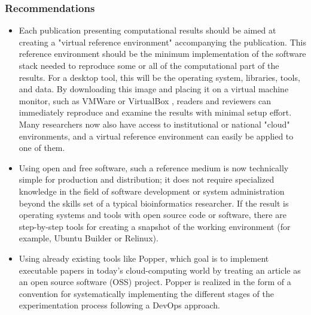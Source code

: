 \documentclass{vldb}
\begin{document}
\subsubsection{Recommendations}
\begin{itemize}
    \item Each publication presenting computational results should be aimed at creating a "virtual reference environment" accompanying the publication. This reference environment should be the minimum implementation of the software stack needed to reproduce some or all of the computational part of the results. For a desktop tool, this will be the operating system, libraries, tools, and data. By downloading this image and placing it on a virtual machine monitor, such as VMWare \cite{vmware} or VirtualBox \cite{virtualbox}, readers and reviewers can immediately reproduce and examine the results with minimal setup effort. Many researchers now also have access to institutional or national "cloud" environments, and a virtual reference environment can easily be applied to one of them.
    \item Using open and free software, such a reference medium is now technically simple for production and distribution; it does not require specialized knowledge in the field of software development or system administration beyond the skills set of a typical bioinformatics researcher. If the result is operating systems and tools with open source code or software, there are step-by-step tools for creating a snapshot of the working environment (for example, Ubuntu Builder \cite{launchpad} or Relinux).
    \item Using already existing tools like Popper\cite{DBLP:conf/infocom/JimenezAALMMR17}, which goal is to implement executable papers in today's cloud-computing world by treating an article as an open source software (OSS) project. Popper is realized in the form of a convention for systematically implementing the different stages of the experimentation process following a DevOps approach.
\end{itemize}
\end{document}
